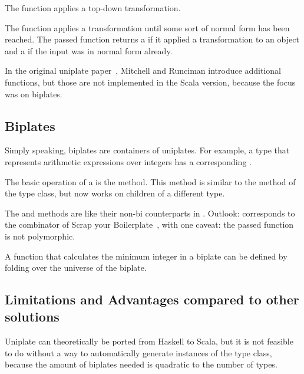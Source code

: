 The  function applies a top-down transformation.

The  function applies a transformation until some sort of
normal form has been reached. The passed function returns a  if
it applied a transformation to an object and a  if the input was
in normal form already.

In the original uniplate paper~\cite{DBLP:conf/haskell/MitchellR07}, Mitchell
and Runciman introduce additional functions, but those are not implemented
in the Scala version, because the focus was on biplates.

\subsection{Biplates}
Simply speaking, biplates are containers of uniplates. For example, a type
 that represents arithmetic expressions over integers has a corresponding
.



The basic operation of a  is the  method. This method
is similar to the  method of the  type class, but now
works on children of a different type.

The  and  methods are like their non-bi counterparts
in . Outlook:  corresponds to the
 combinator of Scrap your Boilerplate~\cite{DBLP:conf/tldi/LammelJ03},
with one caveat: the passed function is not polymorphic.

\begin{example}
A function that calculates the minimum integer in a biplate can be defined
by folding  over the universe of the biplate.


\end{example}

\subsection{Limitations and Advantages compared to other solutions}
Uniplate can theoretically be ported from Haskell to Scala, but it is not
feasible to do without a way to automatically generate instances of the
 type class, because the amount of biplates needed is quadratic
to the number of types.

